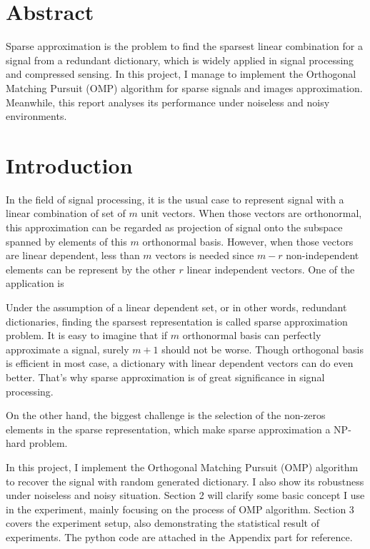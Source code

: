 \documentclass{ucsdreport}
\begin{document}
\section*{Abstract}
Sparse approximation is the problem to find the sparsest linear combination for a signal from a redundant dictionary, which is widely applied in signal processing and compressed sensing. In this project, I manage to implement the Orthogonal Matching Pursuit (OMP) algorithm for sparse signals and images approximation. Meanwhile, this report analyses its performance under noiseless and noisy environments. 

    
\section{Introduction}
In the field of signal processing, it is the usual case to represent signal with a linear combination of set of $m$ unit vectors. When those vectors are orthonormal, this approximation can be regarded as projection of signal onto the subspace spanned by elements of this $m$ orthonormal basis. However, when those vectors are linear dependent, less than $m$ vectors is needed since $m-r$ non-independent elements can be represent by the other $r$ linear independent vectors. One of the application is

Under the assumption of a linear dependent set, or in other words, redundant dictionaries, finding the sparsest representation is called sparse approximation problem. It is easy to imagine that if $m$ orthonormal basis can perfectly approximate a signal, surely $m+1$ should not be worse. Though orthogonal basis is efficient in most case, a dictionary with linear dependent vectors can do even better. That's why sparse approximation is of great significance in signal processing.

On the other hand, the biggest challenge is the selection of the non-zeros elements in the sparse representation, which make sparse approximation a NP-hard problem. 

In this project, I implement the Orthogonal Matching Pursuit (OMP) algorithm to recover the signal with random generated dictionary. I also show its robustness under noiseless and noisy situation. Section 2 will clarify some basic concept I use in the experiment, mainly focusing on the process of OMP algorithm. Section 3 covers the experiment setup, also demonstrating the statistical result of experiments. The python code are attached in the Appendix part for reference.
\end{document}
